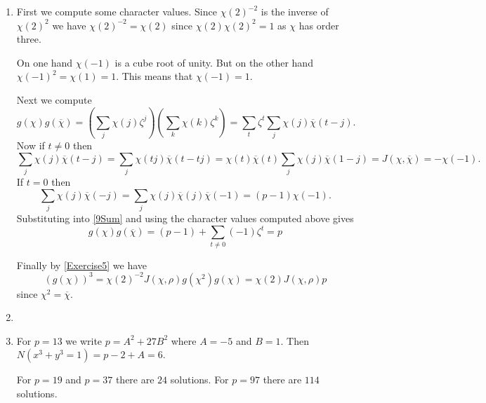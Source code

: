 \documentclass[12pt]{article}
\begin{document}
\begin{enumerate}
\item %
First we compute some character values.
Since $\chi\left(2\right)^{-2}$ is the inverse
of $\chi\left(2\right)^2$
we have $\chi\left(2\right)^{-2}=\chi\left(2\right)$
since $\chi\left(2\right)\chi\left(2\right)^2=1$
as $\chi$ has order three.

On one hand $\chi\left(-1\right)$ is a cube root
of unity. But on the other hand
$\chi\left(-1\right)^2=\chi\left(1\right)=1$.
This means that $\chi\left(-1\right)=1$.

Next we compute
\begin{equation}\label{9Sum}
g\left(\chi\right)g\left(\overline{\chi}\right)
=\left(\sum_j\chi\left(j\right)\zeta^j\right)
\left(\sum_k\chi\left(k\right)\zeta^k\right)
=\sum_t\zeta^t\sum_j\chi\left(j\right)\overline{\chi}\left(t-j\right).
\end{equation}
Now if $t\ne 0$ then
\[\sum_j\chi\left(j\right)\overline{\chi}\left(t-j\right)
=\sum_j\chi\left(tj\right)\overline{\chi}\left(t-tj\right)
=\chi\left(t\right)\overline{\chi}\left(t\right)
\sum_j\chi\left(j\right)\overline{\chi}\left(1-j\right)
=J\left(\chi,\overline{\chi}\right)=-\chi\left(-1\right).\]
If $t=0$ then
\[\sum_j\chi\left(j\right)\overline{\chi}\left(-j\right)
=\sum_j\chi\left(j\right)\overline{\chi}\left(j\right)
\overline{\chi}\left(-1\right)
=\left(p-1\right)\chi\left(-1\right).\]
Substituting into \autoref{9Sum} and using the character values
computed above gives
\[g\left(\chi\right)g\left(\overline{\chi}\right)
=\left(p-1\right)+\sum_{t\ne 0}\left(-1\right)\zeta^t=p\]

Finally by \autoref{Exercise5} we have
\[\left(g\left(\chi\right)\right)^3
=\chi\left(2\right)^{-2}J\left(\chi,\rho\right)g\left(\chi^2\right)
g\left(\chi\right)=\chi\left(2\right)J\left(\chi,\rho\right)p\]
since $\chi^2=\overline{\chi}$.

\item %
\item %
For $p=13$ we write $p=A^2+27B^2$ where $A=-5$ and $B=1$.
Then $N\left(x^3+y^3=1\right)=p-2+A=6$.

For $p=19$ and $p=37$ there are $24$ solutions.
For $p=97$ there are $114$ solutions.
\end{enumerate}
\end{document}
